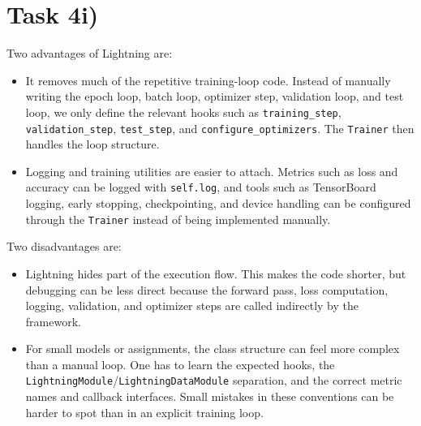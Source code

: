 \documentclass[a4paper,oneside,bibliography=totoc]{scrartcl}
\begin{document}
\section*{Task 4i)}
\begin{answer}[12cm]
	Two advantages of Lightning are:

	\begin{itemize}
		\item It removes much of the repetitive training-loop code. Instead of
		      manually writing the epoch loop, batch loop, optimizer step,
		      validation loop, and test loop, we only define the relevant hooks
		      such as \texttt{training\_step}, \texttt{validation\_step},
		      \texttt{test\_step}, and \texttt{configure\_optimizers}. The
		      \texttt{Trainer} then handles the loop structure.
		\item Logging and training utilities are easier to attach. Metrics such
		      as loss and accuracy can be logged with \texttt{self.log}, and
		      tools such as TensorBoard logging, early stopping, checkpointing,
		      and device handling can be configured through the
		      \texttt{Trainer} instead of being implemented manually.
	\end{itemize}

	Two disadvantages are:

	\begin{itemize}
		\item Lightning hides part of the execution flow. This makes the code
		      shorter, but debugging can be less direct because the forward
		      pass, loss computation, logging, validation, and optimizer steps
		      are called indirectly by the framework.
		\item For small models or assignments, the class structure can feel more
		      complex than a manual loop. One has to learn the expected hooks,
		      the \texttt{LightningModule}/\texttt{LightningDataModule}
		      separation, and the correct metric names and callback interfaces.
		      Small mistakes in these conventions can be harder to spot than in
		      an explicit training loop.
	\end{itemize}
\end{answer}

\end{document}
